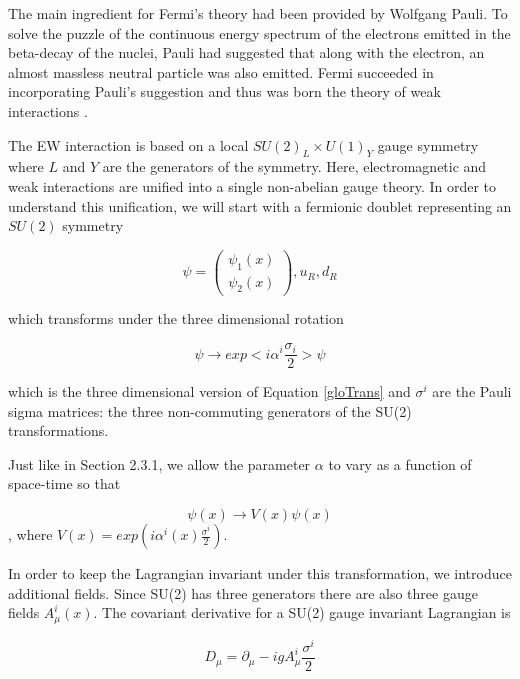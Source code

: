 The main ingredient for Fermi's theory had been provided by Wolfgang Pauli. To solve the puzzle of the continuous energy spectrum of the electrons emitted in the beta-decay of the nuclei, Pauli had suggested that along with the electron, an almost massless neutral particle was also emitted. Fermi succeeded in incorporating Pauli's suggestion and thus was born the theory of weak interactions \cite{Rajasekaran:2014vza}.

The EW interaction is based on a local $SU(2)_{L}\times U(1)_{Y}$ gauge symmetry where $L$ and $Y$ are the generators of the symmetry. Here, electromagnetic and weak interactions are unified into a single non-abelian gauge theory. In order to understand this unification, we will start with a fermionic doublet representing an $SU(2)$ symmetry

\begin{equation}
\psi = \begin{pmatrix}
	\psi_{1}(x) \\
	\psi_{2}(x)
\end{pmatrix}, u_{R}, d_{R}
\end{equation}

which transforms under the three dimensional rotation

\begin{equation}
\psi\rightarrow exp<i\alpha^{i}\frac{\sigma_{i}}{2}>\psi
\end{equation}

which is the three dimensional version of Equation \ref{gloTrans} and $\sigma^{i}$ are the Pauli sigma matrices: the three non-commuting generators of the SU(2) transformations.

Just like in Section 2.3.1, we allow the parameter $\alpha$ to vary as a function of space-time so that

\begin{equation}
\psi(x)\rightarrow V(x)\psi(x)
\end{equation}
, where $V(x)= exp(i\alpha^{i}(x)\frac{\sigma^{i}}{2})$.

In order to keep the Lagrangian invariant under this transformation, we introduce additional fields. Since SU(2) has three generators there are also three gauge fields $A_{\mu}^{i}(x)$. The covariant derivative for a SU(2) gauge invariant Lagrangian is

\begin{equation}
\label{su2cod}
D_{\mu} = \partial_{\mu} - igA_{\mu}^{i}\frac{\sigma^{i}}{2}
\end{equation}

